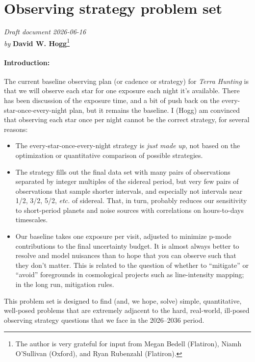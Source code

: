 \documentclass{article}
\theoremstyle{definition}
\theoremstyle{remark}
\begin{document}
\section*{Observing strategy problem set}
\noindent
\textit{Draft document 2026-06-16}\\
\textit{by} \textbf{David W. Hogg}\footnote{The author is very grateful for input from Megan Bedell (Flatiron), Niamh O'Sullivan (Oxford), and Ryan Rubenzahl (Flatiron).}

\paragraph{Introduction:}
The current baseline observing plan (or cadence or strategy) for \textsl{Terra Hunting}
is that we will observe each star for one exposure each night it's available.
There has been discussion of the exposure time, and a bit of push back on the every-star-once-every-night plan, but it remains the baseline.
I (Hogg) am convinced that observing each star once per night cannot be the correct strategy, for several reasons:
\begin{itemize}
\item
The every-star-once-every-night strategy is \emph{just made up}, not based on the optimization or quantitative comparison of possible strategies.
\item
The strategy fills out the final data set with many pairs of observations separated by integer multiples of the sidereal period, but very few pairs of observations that sample shorter intervals, and especially not intervals near 1/2, 3/2, 5/2, \textsl{etc.} of sidereal.
That, in turn, probably reduces our sensitivity to short-period planets and noise sources with correlations on hours-to-days timescales.
\item
Our baseline takes one exposure per visit, adjusted to minimize p-mode contributions to the final uncertainty budget.
It is almost always better to resolve and model nuisances than to hope that you can observe such that they don't matter.
This is related to the question of whether to ``mitigate'' or ``avoid'' foregrounds in cosmological projects such as line-intensity mapping;
in the long run, mitigation rules.
\end{itemize}
This problem set is designed to find (and, we hope, solve) simple, quantitative, well-posed problems that are extremely adjacent to the hard, real-world, ill-posed observing strategy questions that we face in the 2026--2036 period.
\end{document}
